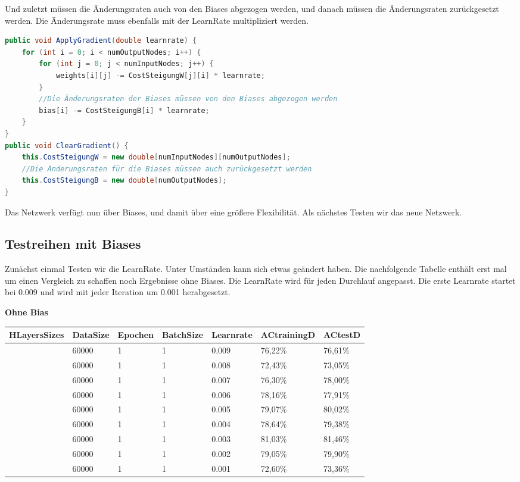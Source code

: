 \documentclass[12pt]{article}
\begin{document}
Und zuletzt  müssen die Änderungsraten auch von den Biases abgezogen werden, und danach müssen die Änderungsraten zurückgesetzt werden. Die Änderungsrate muss ebenfalls mit der LearnRate multipliziert werden.\begin{lstlisting}[language=Java]
public void ApplyGradient(double learnrate) {
    for (int i = 0; i < numOutputNodes; i++) {
        for (int j = 0; j < numInputNodes; j++) {
            weights[i][j] -= CostSteigungW[j][i] * learnrate;
        }
        //Die Änderungsraten der Biases müssen von den Biases abgezogen werden
        bias[i] -= CostSteigungB[i] * learnrate;
    }
}
public void ClearGradient() {
    this.CostSteigungW = new double[numInputNodes][numOutputNodes];
    //Die Änderungsraten für die Biases müssen auch zurückgesetzt werden
    this.CostSteigungB = new double[numOutputNodes];
}
\end{lstlisting}
Das Netzwerk verfügt nun über Biases, und damit über eine größere Flexibilität. Als nächstes Testen wir das neue Netzwerk.
\subsection{Testreihen mit Biases}
Zunächst einmal Testen wir die LearnRate. Unter Umständen kann sich etwas geändert haben.
Die nachfolgende Tabelle enthält erst mal um einen Vergleich zu schaffen noch Ergebnisse ohne Biases. Die LearnRate wird für jeden Durchlauf angepasst. Die erste Learnrate startet bei 0.009 und wird mit jeder Iteration um 0.001 herabgesetzt.

\begin{table}[H]
    \centering
    \textbf{Ohne Bias}
    \begin{tabular}{|l|l|l|l|l|l|l|}
    \hline
        HLayersSizes & DataSize & Epochen & BatchSize & Learnrate & ACtrainingD & ACtestD \\ \hline
        [784, 100, 10] & 60000 & 1 & 1 & 0.009 & 76,22\% & 76,61\% \\ \hline
        [784, 100, 10] & 60000 & 1 & 1 & 0.008 & 72,43\% & 73,05\% \\ \hline
        [784, 100, 10] & 60000 & 1 & 1 & 0.007 & 76,30\% & 78,00\% \\ \hline
        [784, 100, 10] & 60000 & 1 & 1 & 0.006 & 78,16\% & 77,91\% \\ \hline
        [784, 100, 10] & 60000 & 1 & 1 & 0.005 & 79,07\% & 80,02\% \\ \hline
        [784, 100, 10] & 60000 & 1 & 1 & 0.004 & 78,64\% & 79,38\% \\ \hline
        [784, 100, 10] & 60000 & 1 & 1 & 0.003 & 81,03\% & 81,46\% \\ \hline
        [784, 100, 10] & 60000 & 1 & 1 & 0.002 & 79,05\% & 79,90\% \\ \hline
        [784, 100, 10] & 60000 & 1 & 1 & 0.001 & 72,60\% & 73,36\% \\ \hline
    \end{tabular}
\end{table}
\end{document}
